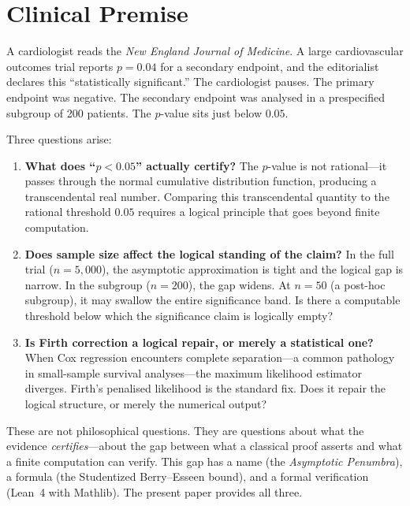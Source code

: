 \documentclass[11pt,a4paper]{article}
\theoremstyle{plain}
\theoremstyle{definition}
\begin{document}
\section{Clinical Premise}\label{sec:premise}

A cardiologist reads the \emph{New England Journal of Medicine}.  A large cardiovascular outcomes trial reports $p = 0.04$ for a secondary endpoint, and the editorialist declares this ``statistically significant.''  The cardiologist pauses.  The primary endpoint was negative.  The secondary endpoint was analysed in a prespecified subgroup of 200 patients.  The $p$-value sits just below $0.05$.

Three questions arise:

\begin{enumerate}[nosep]
\item \textbf{What does ``$p < 0.05$'' actually certify?}  The $p$-value is not rational---it passes through the normal cumulative distribution function, producing a transcendental real number.  Comparing this transcendental quantity to the rational threshold $0.05$ requires a logical principle that goes beyond finite computation.

\item \textbf{Does sample size affect the logical standing of the claim?}  In the full trial ($n = 5{,}000$), the asymptotic approximation is tight and the logical gap is narrow.  In the subgroup ($n = 200$), the gap widens.  At $n = 50$ (a post-hoc subgroup), it may swallow the entire significance band.  Is there a computable threshold below which the significance claim is logically empty?

\item \textbf{Is Firth correction a logical repair, or merely a statistical one?}  When Cox regression encounters complete separation---a common pathology in small-sample survival analyses---the maximum likelihood estimator diverges.  Firth's penalised likelihood is the standard fix.  Does it repair the logical structure, or merely the numerical output?
\end{enumerate}

These are not philosophical questions.  They are questions about what the evidence \emph{certifies}---about the gap between what a classical proof asserts and what a finite computation can verify.  This gap has a name (the \emph{Asymptotic Penumbra}), a formula (the Studentized Berry--Esseen bound), and a formal verification (Lean~4 with Mathlib).  The present paper provides all three.
\end{document}
